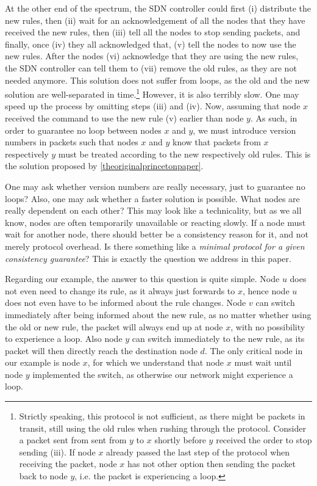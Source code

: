 At the other end of the spectrum, the SDN controller could first (i) distribute the new rules, then (ii) wait for an acknowledgement of all the nodes that they have received the new rules, then (iii) tell all the nodes to stop sending packets, and finally, once (iv) they all acknowledged that, (v) tell the nodes to now use the new rules. After the nodes (vi) acknowledge that they are using the new rules, the SDN controller can tell them to (vii) remove the old rules, as they are not needed anymore. This solution does not suffer from loops, as the old and the new solution are well-separated in time.\footnote{Strictly speaking, this protocol is not sufficient, as there might be packets in transit, still using the old rules when rushing through the protocol. Consider a packet sent from sent from $y$ to $x$ shortly before $y$ received the order to stop sending (iii). If node $x$ already passed the last step of the protocol when receiving the packet, node $x$ has not other option then sending the packet back to node $y$, i.e. the packet is experiencing a loop.} However, it is also terribly slow. One may speed up the process by omitting steps (iii) and (iv). Now, assuming that node $x$ received the command to use the new rule (v) earlier than node $y$. As such, in order to guarantee no loop between nodes $x$ and $y$, we must introduce version numbers in packets such that nodes $x$ and $y$ know that packets from $x$ respectively $y$ must be treated according to the new respectively old rules. This is the solution proposed by \ref{theoriginalprincetonpaper}.

One may ask whether version numbers are really necessary, just to guarantee no loops? Also, one may ask whether a faster solution is possible. What nodes are really dependent on each other? This may look like a technicality, but as we all know, nodes are often temporarily unavailable or reacting slowly. If a node must wait for another node, there should better be a consistency reason for it, and not merely protocol overhead. Is there something like a \emph{minimal protocol for a given consistency guarantee}? This is exactly the question we address in this paper.

Regarding our example, the answer to this question is quite simple. Node $u$ does not even need to change its rule, as it always just forwards to $x$, hence node $u$ does not even have to be informed about the rule changes. Node $v$ can switch immediately after being informed about the new rule, as no matter whether using the old or new rule, the packet will always end up at node $x$, with no possibility to experience a loop. Also node $y$ can switch immediately to the new rule, as its packet will then directly reach the destination node $d$. The only critical node in our example is node $x$, for which we understand that node $x$ must wait until node $y$ implemented the switch, as otherwise our network might experience a loop.


